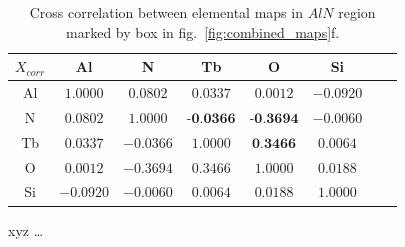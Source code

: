 \documentclass[%
 aip,
rsi,%
 amsmath,amssymb,
 reprint,%
]{revtex4-1}
\begin{document}
\begin{table}[!ht]
	\caption{Cross correlation between elemental maps in $AlN$ region marked by box in fig.~\ref{fig:combined_maps}f.}
    \label{tab:xcorr}
    \begin{ruledtabular}
    	\begin{tabular}{cccccccc}
        	$X_{corr}$&Al&N&Tb&O&Si													\\ \hline
            Al& $1.0000$& $0.0802$& $0.0337$& $0.0012$&$-0.0920$					\\
             N& $0.0802$& $1.0000$& $\textbf{-0.0366}$&$\textbf{-0.3694}$&$-0.0060$	\\
            Tb& $0.0337$&$-0.0366$& $1.0000$& $\textbf{0.3466}$&$0.0064$			\\
             O& $0.0012$&$-0.3694$&	$0.3466$& $1.0000$&$0.0188$						\\
            Si&$-0.0920$&$-0.0060$&$0.0064$&$0.0188$& $1.0000$
    	\end{tabular}
    \end{ruledtabular}
\end{table}



\begin{acknowledgments}
xyz
\dots
\end{acknowledgments}

\end{document}
